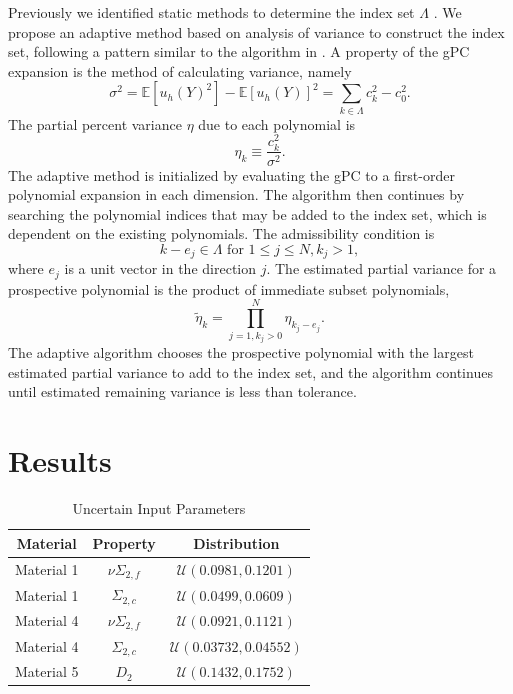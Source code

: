 \documentclass{anstrans} \usepackage{amsmath} \usepackage{amssymb}
\newcommand{\expv}[1]{\ensuremath{\mathbb{E}[ #1]}} \newcommand{\xs}[2]{\ensuremath{\Sigma_{#1}^{(#2)}}}
\begin{document}
Previously we identified static methods to determine the index set $\Lambda$ \cite{ans2014}.  We propose an
adaptive method based on analysis of variance to construct the index set, following a pattern similar to the
algorithm in \cite{Ayres}.  A property of the gPC expansion is the method of calculating variance, namely
\begin{equation}
  \sigma^2 = \expv{u_h(Y)^2} - \expv{u_h(Y)}^2 = \sum_{k\in\Lambda}c_k^2 - c_0^2.
\end{equation}
The partial percent variance $\eta$ due to each polynomial is
\begin{equation}
  \eta_k \equiv \frac{c_k^2}{\sigma^2}.
\end{equation}
The adaptive method is initialized by evaluating the gPC to a first-order polynomial expansion in each
dimension.  The algorithm then continues by searching the polynomial indices that may be added to the index
set, which is dependent on the existing polynomials.  The admissibility condition is
\begin{equation}
  k-e_j\in\Lambda \text{  for } 1\leq j\leq N, k_j>1,
\end{equation}
where $e_j$ is a unit vector in the direction $j$.  The estimated partial variance for a prospective polynomial 
is the product of immediate subset polynomials,
\begin{equation}
  \tilde \eta_k = \prod_{j=1,k_j>0}^N \eta_{k_j-e_j}.
\end{equation}
The adaptive algorithm chooses the prospective polynomial with the largest estimated partial variance to add
to the index set, and the algorithm continues until estimated remaining variance is less than tolerance.

\section{Results}\label{results}
\begin{table}[H] \centering \begin{tabular}{c|c|c} Material & Property & Distribution \\ \hline Material 1 &
    $\nu\Sigma_{2,f}$ & $\mathcal{U}(0.0981,0.1201)$ \\ Material 1 & $\Sigma_{2,c}$ &
    $\mathcal{U}(0.0499,0.0609)$  \\ Material 4 & $\nu\Sigma_{2,f}$ & $\mathcal{U}(0.0921,0.1121)$ \\ Material
    4 & $\Sigma_{2,c}$ & $\mathcal{U}(0.03732,0.04552)$  \\ Material 5 & $D_2$ & $\mathcal{U}(0.1432,0.1752)$
  \end{tabular} \caption{Uncertain Input Parameters} \label{params} \end{table}
\end{document}
